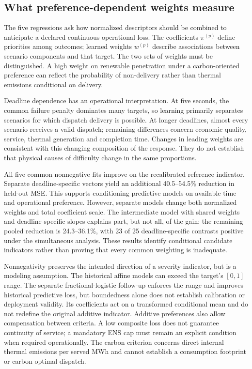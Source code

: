 \subsection{What preference-dependent weights measure}
\label{sec:p1_index_construction}
The five regressions ask how normalized descriptors should be combined to
anticipate a declared continuous operational loss. The coefficients
$\pi^{(p)}$ define priorities among outcomes; learned weights $w^{(p)}$
describe associations between scenario components and that target. The two
sets of weights must be distinguished. A high weight on renewable
penetration under a carbon-oriented preference can reflect the probability
of non-delivery rather than thermal emissions conditional on delivery.

Deadline dependence has an operational interpretation. At five seconds,
the common failure penalty dominates many targets, so learning primarily
separates scenarios for which dispatch delivery is possible. At longer
deadlines, almost every scenario receives a valid dispatch; remaining
differences concern economic quality, service, thermal generation and
completion time. Changes in leading weights are consistent with this
changing composition of the response. They do not establish that physical
causes of difficulty change in the same proportions.

All five common nonnegative fits improve on the recalibrated reference
indicator. Separate deadline-specific vectors yield an additional
40.5--54.5\% reduction in held-out MSE. This supports conditioning predictive
models on available time and operational preference. However, separate
models change both normalized weights and total coefficient scale. The
intermediate model with shared weights and deadline-specific
slopes explains part, but not all, of the gain: the remaining pooled
reduction is 24.3--36.1\%, with 23 of 25 deadline-specific contrasts positive
under the simultaneous analysis. These results identify conditional
candidate indicators rather than proving that every common weighting is
inadequate.

Nonnegativity preserves the intended direction of a severity indicator,
but is a modeling assumption. The historical affine models can exceed the
target's $[0,1]$ range. The separate fractional-logistic follow-up enforces
the range and improves historical predictive loss, but boundedness alone
does not establish calibration or deployment validity. Its coefficients
act on a transformed conditional mean and do not redefine the original
additive indicator. Additive preferences also allow compensation between criteria.
A low composite loss does not guarantee continuity of service; a mandatory
ENS cap must remain an explicit condition when required operationally.
The carbon criterion concerns direct internal thermal emissions per served
MWh and cannot establish a consumption footprint or carbon-optimal dispatch.

